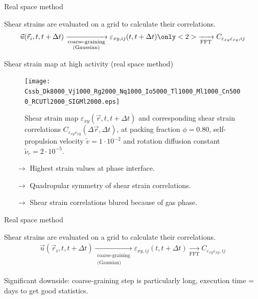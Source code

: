 \documentclass{beamer}
\begin{document}
\begin{frame}{Real space method}

Shear strains are evaluated on a grid to calculate their correlations.
\begin{align*}
\vec{u}(\vec{r}_i, t, t + \Delta t) \xrightarrow[\substack{\text{coarse-graining}\\\text{(Gaussian)}}]{} \varepsilon_{xy,ij}(t, t + \Delta t) \only<2>{\xrightarrow[\text{FFT}]{} C_{\varepsilon_{xy}\varepsilon_{xy}, ij}}
\end{align*}

\end{frame}

\begin{frame}{Shear strain map at high activity (real space method)}

\vspace{-0.2cm}
\begin{figure}[h!]
  \centering
  \texttt{[image: Cssb\_Dk8000\_Vj1000\_Rg2000\_Nq1000\_Io5000\_Tl1000\_Ml1000\_Cn5000\_RCUTl2000\_SIGMl2000.eps]}
  \vspace{-0.6cm}
  \caption{Shear strain map $\varepsilon_{xy}(\vec{r}, t, t + \Delta t)$ and corresponding shear strain correlations $C_{\varepsilon_{xy}\varepsilon_{xy}}(\Delta\vec{r}, \Delta t)$, at packing fraction $\phi=0.80$, self-propulsion velocity $\tilde{v}=1\cdot10^{-2}$ and rotation diffusion constant $\tilde{\nu}_r=2\cdot10^{-5}$.}
\end{figure}

\vspace{-0.5cm}
\begin{itemize}
  \item[$\rightarrow$] Highest strain values at phase interface.
  \item[$\rightarrow$] Quadropular symmetry of shear strain correlations.
  \item[$\rightarrow$] Shear strain correlations blured because of gas phase.
\end{itemize}

\end{frame}

\begin{frame}{Real space method}

Shear strains are evaluated on a grid to calculate their correlations.
\begin{align*}
\vec{u}(\vec{r}_i, t, t + \Delta t) \xrightarrow[\substack{\text{coarse-graining}\\\text{(Gaussian)}}]{} \varepsilon_{xy,ij}(t, t + \Delta t) \xrightarrow[\text{FFT}]{} C_{\varepsilon_{xy}\varepsilon_{xy}, ij}
\end{align*}

Significant downside: coarse-graining step is particularly long, execution time = days to get good statistics.\\


\end{frame}
\end{document}
